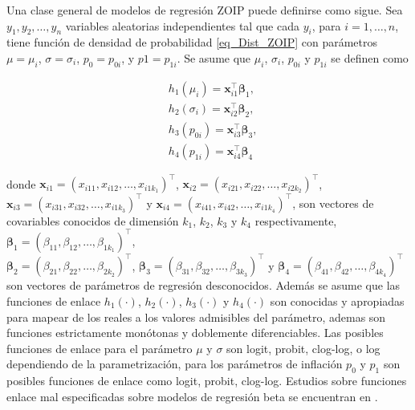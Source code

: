 Una clase general de modelos de regresi\'{o}n ZOIP puede definirse como sigue. Sea $y_1, y_2,\ldots, y_n$ variables aleatorias independientes tal que cada $y_i$, para $i=1,\ldots, n$, tiene funci\'{o}n de densidad de probabilidad \eqref{eq_Dist_ZOIP} con par\'{a}metros $\mu = \mu_i$, $\sigma=\sigma_i$, $p_0=p_{0i}$, y $p1=p_{1i}$. Se asume que $\mu_i$, $\sigma_i$, $p_{0i}$ y $p_{1i}$ se definen como

\begin{equation}
\begin{split}
&h_1(\mu_{i})=\mathbf{x}_{i1}^{\top} \boldsymbol{\beta}_1,\\
&h_2(\sigma_{i})=\mathbf{x}_{i2}^{\top} \boldsymbol{\beta}_2,\\
&h_3(p_{0i})=\mathbf{x}_{i3}^{\top} \boldsymbol{\beta}_3,\\
&h_4(p_{1i}) =\mathbf{x}_{i4}^{\top} \boldsymbol{\beta}_4
\end{split}
\label{eq_reg}
\end{equation}

donde $\mathbf{x}_{i1}=(x_{i11}, x_{i12},\ldots, x_{i1k_1})^{\top}$, $\mathbf{x}_{i2}=(x_{i21}, x_{i22},\ldots, x_{i2k_2})^{\top}$, \\
$\mathbf{x}_{i3}=(x_{i31}, x_{i32},\ldots, x_{i1k_3})^{\top}$ y $\mathbf{x}_{i4}=(x_{i41}, x_{i42},\ldots, x_{i1k_4})^{\top}$, son vectores de covariables conocidos de dimensi\'{o}n $k_1$, $k_2$, $k_3$ y $k_4$ respectivamente, $\boldsymbol{\beta}_1=(\beta_{11}, \beta_{12},\ldots, \beta_{1k_1})^{\top}$, \\
$\boldsymbol{\beta}_2=(\beta_{21}, \beta_{22},\ldots, \beta_{2k_2})^{\top}$, $\boldsymbol{\beta}_3=(\beta_{31}, \beta_{32},\ldots, \beta_{3k_3})^{\top}$ y $\boldsymbol{\beta}_4=(\beta_{41}, \beta_{42},\ldots, \beta_{4k_4})^{\top}$ son vectores de par\'{a}metros de regresi\'{o}n desconocidos. Adem\'{a}s se asume que las funciones de enlace $h_1(\cdot)$, $h_2(\cdot)$, $h_3(\cdot)$ y $h_4(\cdot)$ son conocidas y apropiadas para mapear de los reales a los valores admisibles del par\'{a}metro, ademas son funciones estrictamente mon\'{o}tonas y doblemente diferenciables. Las posibles funciones de enlace para el par\'{a}metro $\mu$ y $\sigma$ son logit, probit, clog-log, o log dependiendo de la parametrizaci\'{o}n, para los par\'{a}metros de inflaci\'{o}n $p_0$ y $p_1$ son posibles funciones de enlace como logit, probit, clog-log. Estudios sobre funciones enlace mal especificadas sobre modelos de regresi\'{o}n beta se encuentran en \cite{andrade07}.

